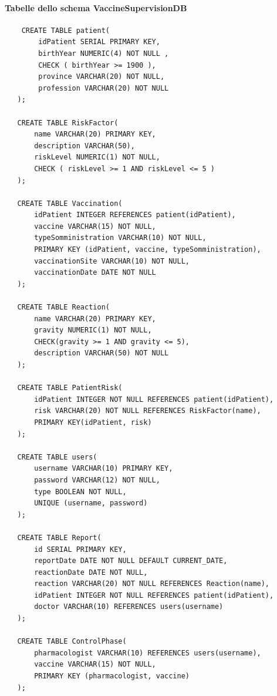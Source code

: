 \documentclass{article}
\begin{document}
\paragraph*{Tabelle dello schema VaccineSupervisionDB}
\begin{verbatim}
    CREATE TABLE patient(
        idPatient SERIAL PRIMARY KEY,
        birthYear NUMERIC(4) NOT NULL ,
        CHECK ( birthYear >= 1900 ),
        province VARCHAR(20) NOT NULL,
        profession VARCHAR(20) NOT NULL
   );
   
   CREATE TABLE RiskFactor(
       name VARCHAR(20) PRIMARY KEY,
       description VARCHAR(50),
       riskLevel NUMERIC(1) NOT NULL,
       CHECK ( riskLevel >= 1 AND riskLevel <= 5 )
   );
   
   CREATE TABLE Vaccination(
       idPatient INTEGER REFERENCES patient(idPatient),
       vaccine VARCHAR(15) NOT NULL,
       typeSomministration VARCHAR(10) NOT NULL,
       PRIMARY KEY (idPatient, vaccine, typeSomministration),
       vaccinationSite VARCHAR(10) NOT NULL,
       vaccinationDate DATE NOT NULL
   );
   
   CREATE TABLE Reaction(
       name VARCHAR(20) PRIMARY KEY,
       gravity NUMERIC(1) NOT NULL,
       CHECK(gravity >= 1 AND gravity <= 5),
       description VARCHAR(50) NOT NULL
   );
   
   CREATE TABLE PatientRisk(
       idPatient INTEGER NOT NULL REFERENCES patient(idPatient),
       risk VARCHAR(20) NOT NULL REFERENCES RiskFactor(name),
       PRIMARY KEY(idPatient, risk)
   );
   
   CREATE TABLE users(
       username VARCHAR(10) PRIMARY KEY,
       password VARCHAR(12) NOT NULL,
       type BOOLEAN NOT NULL,
       UNIQUE (username, password)
   );
   
   CREATE TABLE Report(
       id SERIAL PRIMARY KEY,
       reportDate DATE NOT NULL DEFAULT CURRENT_DATE,
       reactionDate DATE NOT NULL,
       reaction VARCHAR(20) NOT NULL REFERENCES Reaction(name),
       idPatient INTEGER NOT NULL REFERENCES patient(idPatient),
       doctor VARCHAR(10) REFERENCES users(username)
   );
   
   CREATE TABLE ControlPhase(
       pharmacologist VARCHAR(10) REFERENCES users(username),
       vaccine VARCHAR(15) NOT NULL,
       PRIMARY KEY (pharmacologist, vaccine)
   );
\end{verbatim}
\end{document}
